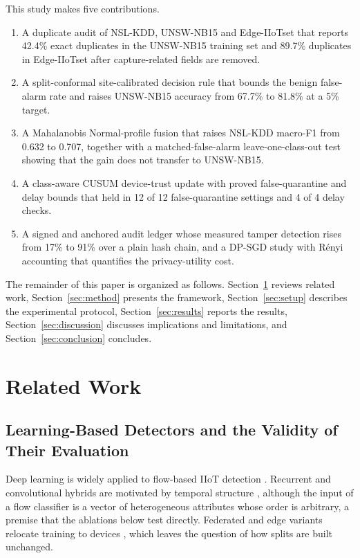 \documentclass[journal]{IEEEtran}
\begin{document}
This study makes five contributions.
\begin{enumerate}
\item A duplicate audit of NSL-KDD, UNSW-NB15 and Edge-IIoTset that reports 42.4\% exact duplicates in the UNSW-NB15 training set and 89.7\% duplicates in Edge-IIoTset after capture-related fields are removed.
\item A split-conformal site-calibrated decision rule that bounds the benign false-alarm rate and raises UNSW-NB15 accuracy from 67.7\% to 81.8\% at a 5\% target.
\item A Mahalanobis Normal-profile fusion that raises NSL-KDD macro-F1 from 0.632 to 0.707, together with a matched-false-alarm leave-one-class-out test showing that the gain does not transfer to UNSW-NB15.
\item A class-aware CUSUM device-trust update with proved false-quarantine and delay bounds that held in 12 of 12 false-quarantine settings and 4 of 4 delay checks.
\item A signed and anchored audit ledger whose measured tamper detection rises from 17\% to 91\% over a plain hash chain, and a DP-SGD study with R\'enyi accounting that quantifies the privacy-utility cost.
\end{enumerate}

The remainder of this paper is organized as follows. Section~\ref{sec:related} reviews related work, Section~\ref{sec:method} presents the framework, Section~\ref{sec:setup} describes the experimental protocol, Section~\ref{sec:results} reports the results, Section~\ref{sec:discussion} discusses implications and limitations, and Section~\ref{sec:conclusion} concludes.

\section{Related Work}\label{sec:related}
\subsection{Learning-Based Detectors and the Validity of Their Evaluation}
Deep learning is widely applied to flow-based IIoT detection \cite{nandanwar2024deep,hamouda2024revolutionizing,mohamed2025artificial}. Recurrent and convolutional hybrids are motivated by temporal structure \cite{hochreiter1997long,graves2005framewise,lecun2015deep}, although the input of a flow classifier is a vector of heterogeneous attributes whose order is arbitrary, a premise that the ablations below test directly. Federated and edge variants relocate training to devices \cite{bhavsar2024fl,yao2023privacy}, which leaves the question of how splits are built unchanged.
\end{document}
